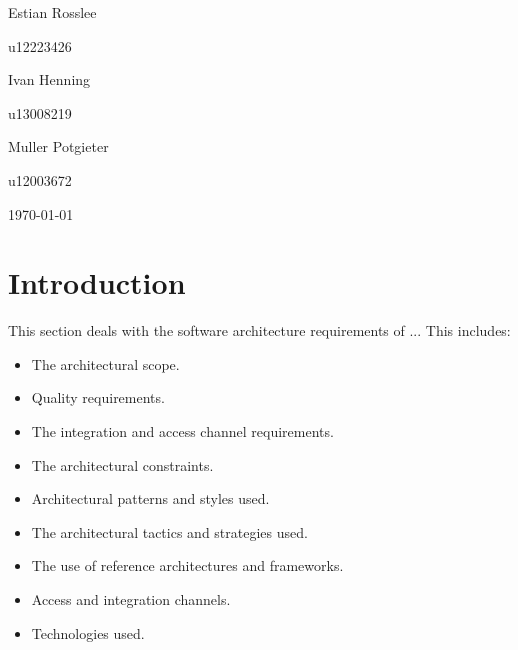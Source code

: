 \documentclass[hidelinks,a4paper,12pt]{article}
\begin{document}
\begin{titlepage}
\begin{center}
\begin{minipage}{0.4\textwidth}
\begin{flushleft} \large
Estian {Rosslee}
\end{flushleft}
\end{minipage}
\begin{minipage}{0.4\textwidth}
\begin{flushright} \large
\emph{}
u12223426
\end{flushright}
\end{minipage}

\begin{minipage}{0.4\textwidth}
\begin{flushleft} \large
Ivan {Henning}
\end{flushleft}
\end{minipage}
\begin{minipage}{0.4\textwidth}
\begin{flushright} \large
\emph{}
u13008219
\end{flushright}
\end{minipage}

\begin{minipage}{0.4\textwidth}
\begin{flushleft} \large
Muller {Potgieter}
\end{flushleft}
\end{minipage}
\begin{minipage}{0.4\textwidth}
\begin{flushright} \large
\emph{}
u12003672
\end{flushright}
\end{minipage}

\vfill
{\large \today}
\end{center}
\end{titlepage}
\footnotesize
%
\normalsize


\tableofcontents
\newpage
{}

\newpage
\section{Introduction} This section deals with the software architecture requirements of ... This includes:
	\begin{itemize} 
		\item The architectural scope.
		\item Quality requirements.
		\item The integration and access channel requirements.
		\item The architectural constraints.
		\item Architectural patterns and styles used.
		\item The architectural tactics and strategies used.
		\item The use of reference architectures and frameworks.
		\item Access and integration channels.
		\item Technologies used.
	\end{itemize}
\end{document}
